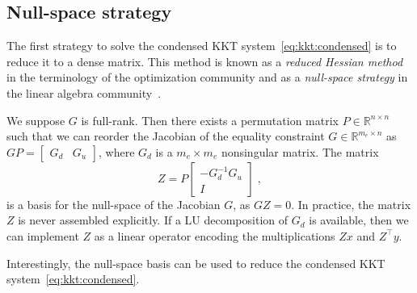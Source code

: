 \subsection{Null-space strategy}
\label{sec:kkt:nullspace}
The first strategy to solve the condensed KKT system~\eqref{eq:kkt:condensed}
is to reduce it to a dense matrix. This
method is known as a \emph{reduced Hessian method} in the
terminology of the optimization community \cite{biegler1995reduced}
and as a \emph{null-space strategy} in the linear algebra
community~\cite[Section 6]{benzi2005numerical}.

We suppose $G$ is full-rank.
Then there exists a permutation matrix $P \in \mathbb{R}^{n \times n}$
such that we can reorder the Jacobian of the equality constraint
$G \in \mathbb{R}^{m_e \times n}$ as $GP = \begin{bmatrix}
  G_d & G_u
\end{bmatrix}$, where $G_d$ is a $m_e \times m_e$ nonsingular matrix.
The matrix
\begin{equation}
  \label{eq:nullspace}
  Z = P \begin{bmatrix}
    - G_d^{-1} G_u \\ I
  \end{bmatrix} \; ,
\end{equation}
is a basis for the null-space of the Jacobian $G$, as $GZ = 0$.
In practice, the matrix $Z$ is never assembled explicitly.
If a LU decomposition of $G_d$ is available, then we can
implement $Z$ as a linear operator encoding the multiplications
$Z x$ and $Z^\top y$.

Interestingly, the null-space basis can be used to reduce the condensed
KKT system~\eqref{eq:kkt:condensed}.

